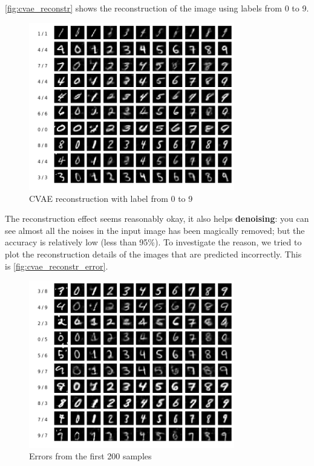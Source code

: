 \documentclass[a4paper,10pt,UTF8]{article}
\numberwithin{equation}{section}
\numberwithin{figure}{section}
\begin{document}
\autoref{fig:cvae_reconstr} shows the reconstruction of the image using labels from 0 to 9.

\begin{figure}[htbp]
\centering
\includegraphics[width=0.8\textwidth]{img/cvae_reconstr.png}
\caption{CVAE reconstruction with label from 0 to 9}
\label{fig:cvae_reconstr}
\end{figure}

The reconstruction effect seems reasonably okay, it also helps \textbf{denoising}: you can see almost all the noises in the input image has been magically removed; but the accuracy is relatively low (less than 95\%). To investigate the reason, we tried to plot the reconstruction details of the images that are predicted incorrectly. This is \autoref{fig:cvae_reconstr_error}.

\begin{figure}[htbp]
\centering
\includegraphics[width=0.8\textwidth]{img/cvae_reconstr_error.png}
\caption{Errors from the first 200 samples}
\label{fig:cvae_reconstr_error}
\end{figure}
\end{document}
